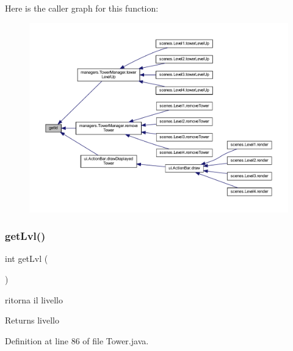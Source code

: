 Here is the caller graph for this function\+:
\nopagebreak
\begin{figure}[H]
\begin{center}
\leavevmode
\includegraphics[width=350pt]{classtowers_1_1_tower_a67283be3f45257d1e0c474c563ebb6b6_icgraph}
\end{center}
\end{figure}
\mbox{\label{classtowers_1_1_tower_a69ffaa5d69141ba9aed07daf94b18540}} 
\subsubsection{\texorpdfstring{get\+Lvl()}{getLvl()}}
{\footnotesize\ttfamily int get\+Lvl (\begin{DoxyParamCaption}{ }\end{DoxyParamCaption})}



ritorna il livello 

\begin{DoxyReturn}{Returns}
livello 
\end{DoxyReturn}


Definition at line 86 of file Tower.\+java.

